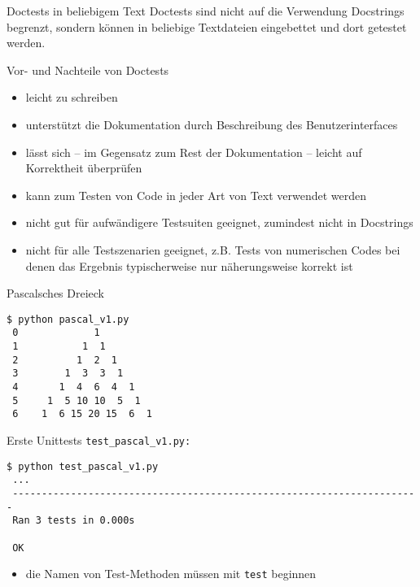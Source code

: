 \documentclass[t, utf8x, 10pt]{beamer}
\newcommand\pro{\textcolor{pro}{\faicon{smile-o}}}
\newcommand\contra{\textcolor{contra}{\faicon{frown-o}}}
\begin{document}
\begin{frame}[c]{Doctests in beliebigem Text}
 Doctests sind nicht auf die Verwendung Docstrings begrenzt, sondern können in
 beliebige Textdateien eingebettet und dort getestet werden.
\end{frame}


\begin{frame}[c]{Vor- und Nachteile von Doctests}
 \begin{itemize}
  \item[\pro]    leicht zu schreiben
  \item[\pro]    unterstützt die Dokumentation durch Beschreibung des
	         Benutzerinterfaces
  \item[\pro]    lässt sich -- im Gegensatz zum Rest der Dokumentation -- leicht
	         auf Korrektheit überprüfen
  \item[\pro]    kann zum Testen von Code in jeder Art von Text verwendet
                 werden\\[0.5truecm]
  \item[\contra] nicht gut für aufwändigere Testsuiten geeignet, zumindest nicht
	         in Docstrings
  \item[\contra] nicht für alle Testszenarien geeignet, z.B. Tests
	         von numerischen Codes bei denen das Ergebnis typischerweise
		 nur näherungsweise korrekt ist
 \end{itemize}
\end{frame}


\begin{frame}[fragile]{Pascalsches Dreieck}
 \begin{small}
  

  \begin{lstlisting}[language={}]
 $ python pascal_v1.py 
 0             1           
 1           1  1          
 2          1  2  1        
 3        1  3  3  1       
 4       1  4  6  4  1     
 5     1  5 10 10  5  1    
 6    1  6 15 20 15  6  1 
  \end{lstlisting}
 \end{small}
\end{frame}


\begin{frame}[fragile]{Erste Unittests}
 \texttt{test\_pascal\_v1.py:}
 \begin{scriptsize}
  

  \hrulefill

  \begin{lstlisting}[language={}]
 $ python test_pascal_v1.py 
 ...
 ----------------------------------------------------------------------
 Ran 3 tests in 0.000s
 
 OK
  \end{lstlisting}
 \end{scriptsize}
 \begin{itemize}
	 \item die Namen von Test-Methoden müssen mit \texttt{test} beginnen
 \end{itemize}
\end{frame}
\end{document}
